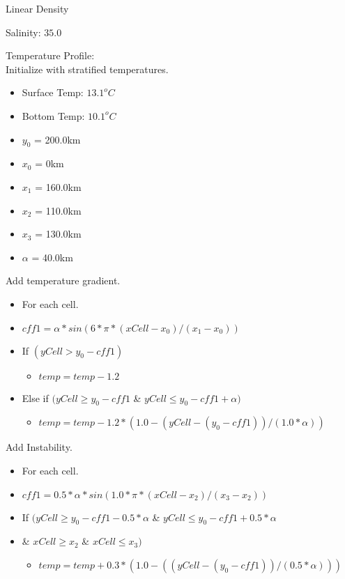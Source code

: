 \documentclass[11pt]{report}
\begin{document}
\noindent Linear Density

\noindent Salinity: $35.0$

\noindent Temperature Profile: \\

Initialize with stratified temperatures.
\begin{itemize}
	\item Surface Temp: $13.1^oC$
	\item Bottom Temp: $10.1^oC$
\end{itemize}

\begin{itemize}
	\item $y_0$ = 200.0km
	\item $x_0$ = 0km
	\item $x_1$ = 160.0km
	\item $x_2$ = 110.0km
	\item $x_3$ = 130.0km
	\item $\alpha$ = 40.0km
\end{itemize}


Add temperature gradient.
\begin{itemize}
	\item For each cell.
	\item $cff1 = \alpha * sin ( 6 * \pi * (xCell - x_0) / ( x_1 - x_0))$
	\item If $(yCell > y_0 - cff1)$
	\begin{itemize}
		\item $temp = temp - 1.2$
	\end{itemize}
	\item Else if $(yCell \geq y_0 - cff1$ \& $yCell \leq y_0 - cff1 + \alpha)$
	\begin{itemize}
		\item $temp = temp - 1.2 * ( 1.0 - ( yCell - (y_0 - cff1)) / ( 1.0 * \alpha))$
	\end{itemize}
\end{itemize}

Add Instability.
\begin{itemize}
	\item For each cell.
	\item $cff1 = 0.5 * \alpha * sin ( 1.0 * \pi * ( xCell - x_2)/(x_3 - x_2))$
	\item If $(yCell \geq y_0 - cff1 - 0.5 * \alpha$ \& $yCell \leq y_0 - cff1 + 0.5 * \alpha$ 
	\item \& $xCell \geq x_2$ \& $xCell \leq x_3)$
	\begin{itemize}
		\item $temp = temp + 0.3 * (1.0 - ( ( yCell - (y_0 - cff1))/(0.5 * \alpha)))$
	\end{itemize}
\end{itemize}
\end{document}
